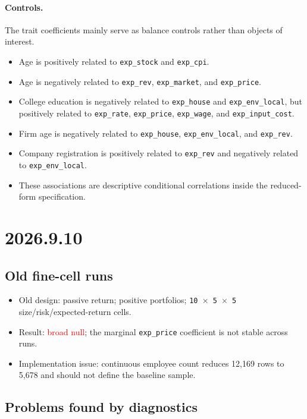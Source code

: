 \documentclass[11pt,letterpaper,english,final]{article}
\begin{document}
\paragraph{Controls.}
The trait coefficients mainly serve as balance controls rather than objects of interest.
\begin{itemize}
\item Age is positively related to \texttt{exp\_stock} and \texttt{exp\_cpi}.
\item Age is negatively related to \texttt{exp\_rev}, \texttt{exp\_market}, and \texttt{exp\_price}.
\item College education is negatively related to \texttt{exp\_house} and \texttt{exp\_env\_local}, but positively related to \texttt{exp\_rate}, \texttt{exp\_price}, \texttt{exp\_wage}, and \texttt{exp\_input\_cost}.
\item Firm age is negatively related to \texttt{exp\_house}, \texttt{exp\_env\_local}, and \texttt{exp\_rev}.
\item Company registration is positively related to \texttt{exp\_rev} and negatively related to \texttt{exp\_env\_local}.
\item These associations are descriptive conditional correlations inside the reduced-form specification.
\end{itemize}

\clearpage
\section{2026.9.10}
\setcounter{table}{0}

\subsection{Old fine-cell runs}

\begin{itemize}
\item Old design: passive return; positive portfolios; \texttt{10 $\times$ 5 $\times$ 5} size/risk/expected-return cells.
\item Result: \textcolor{red}{broad null}; the marginal \texttt{exp\_price} coefficient is not stable across runs.
\item Implementation issue: continuous employee count reduces 12{,}169 rows to 5{,}678 and should not define the baseline sample.
\end{itemize}

\subsection{Problems found by diagnostics}
\end{document}
